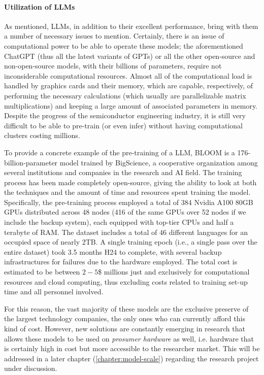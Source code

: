 \paragraph{Utilization of LLMs} As mentioned, LLMs, in addition to their excellent performance, bring with them a number of necessary issues to mention. Certainly, there is an issue of computational power to be able to operate these models; the aforementioned ChatGPT (thus all the latest variants of GPTs) or all the other open-source and non-open-source models, with their billions of parameters, require not inconsiderable computational resources. Almost all of the computational load is handled by graphics cards and their memory, which are capable, respectively, of performing the necessary calculations (which usually are parallelizable matrix multiplications) and keeping a large amount of associated parameters in memory. Despite the progress of the semiconductor engineering industry, it is still very difficult to be able to pre-train (or even infer) without having computational clusters costing millions. 

To provide a concrete example of the pre-training of a LLM, BLOOM \citep{workshop2023bloom} is a 176-billion-parameter model trained by BigScience, a cooperative organization among several institutions and companies in the research and AI field. The training process has been made completely open-source, giving the ability to look at both the techniques and the amount of time and resources spent training the model. Specifically, the pre-training process employed a total of 384 Nvidia A100 80GB GPUs distributed across 48 nodes (416 of the same GPUs over 52 nodes if we include the backup system), each equipped with top-tier CPUs and half a terabyte of RAM. The dataset includes a total of 46 different languages for an occupied space of nearly 2TB. A single training epoch (i.e., a single pass over the entire dataset) took 3.5 months H24 to complete, with several backup infrastructures for failures due to the hardware employed. The total cost is estimated to be between $2-5$\$ millions just and exclusively for computational resources and cloud computing, thus excluding costs related to training set-up time and all personnel involved.

For this reason, the vast majority of these models are the exclusive preserve of the largest technology companies, the only ones who can currently afford this kind of cost. However, new solutions are constantly emerging in research that allows these models to be used on \textit{prosumer hardware} as well, i.e. hardware that is certainly high in cost but more accessible to the researcher market. This will be addressed in a later chapter (\ref{chapter:model-scale}) regarding the research project under discussion.

